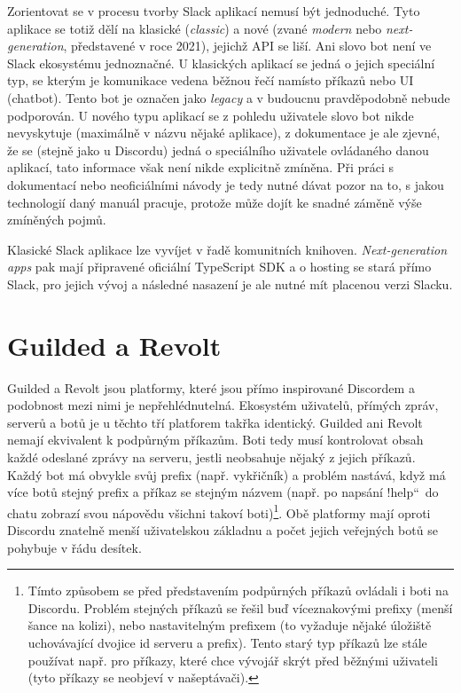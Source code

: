 \documentclass[FM]{tulthesis}
\begin{document}
	Zorientovat se v procesu tvorby Slack aplikací nemusí být jednoduché. Tyto aplikace se totiž dělí na klasické (\textit{classic}) a nové (zvané \textit{modern} nebo \textit{next-generation}, představené v roce 2021), jejichž API se liší. Ani slovo bot není ve Slack ekosystému jednoznačné. U klasických aplikací se jedná o jejich speciální typ, se kterým je komunikace vedena běžnou řečí namísto příkazů nebo UI (chatbot). Tento bot je označen jako \textit{legacy} a v budoucnu pravděpodobně nebude podporován. U nového typu aplikací se z pohledu uživatele slovo bot nikde nevyskytuje (maximálně v názvu nějaké aplikace), z dokumentace je ale zjevné, že se (stejně jako u Discordu) jedná o speciálního uživatele ovládaného danou aplikací, tato informace však není nikde explicitně zmíněna. Při práci s dokumentací nebo neoficiálními návody je tedy nutné dávat pozor na to, s jakou technologií daný manuál pracuje, protože může dojít ke snadné záměně výše zmíněných pojmů.
	
	Klasické Slack aplikace lze vyvíjet v řadě komunitních knihoven. \textit{Next-generation apps} pak mají připravené oficiální \mbox{TypeScript} SDK a o hosting se stará přímo Slack, pro jejich vývoj a následné nasazení je ale nutné mít placenou verzi Slacku.
	
	\section{Guilded a Revolt}
	
	Guilded a Revolt jsou platformy, které jsou přímo inspirované Discordem a podobnost mezi nimi je nepřehlédnutelná. Ekosystém uživatelů, přímých zpráv, serverů a botů je u těchto tří platforem takřka identický. Guilded ani Revolt nemají ekvivalent k podpůrným příkazům. Boti tedy musí kontrolovat obsah každé odeslané zprávy na serveru, jestli neobsahuje nějaký z jejich příkazů. Každý bot má obvykle svůj prefix (např. vykřičník) a problém nastává, když má více botů stejný prefix a příkaz se stejným názvem (např. po napsání \quotedblbase!help\textquotedblleft\ do chatu zobrazí svou nápovědu všichni takoví boti)\footnote{Tímto způsobem se před představením podpůrných příkazů ovládali i boti na Discordu. Problém stejných příkazů se řešil buď víceznakovými prefixy (menší šance na kolizi), nebo nastavitelným prefixem (to vyžaduje nějaké úložiště uchovávající dvojice id serveru a prefix). Tento starý typ příkazů lze stále používat např. pro příkazy, které chce vývojář skrýt před běžnými uživateli (tyto příkazy se neobjeví v našeptávači).}. Obě platformy mají oproti Discordu znatelně menší uživatelskou základnu a počet jejich veřejných botů se pohybuje v řádu desítek.
	
\end{document}

